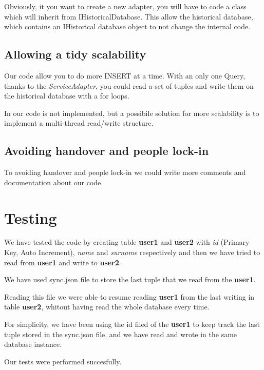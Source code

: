 Obviously, it you want to create a new adapter, you will have to code a class which will inherit from IHistoricalDatabase. This allow the historical database, which contains an IHistorical database object to not change the internal code.

\subsection{Allowing a tidy scalability}

Our code allow you to do more INSERT at a time. With an only one Query, thanks to the \textit{ServiceAdapter}, you could read a set of tuples and write them on the historical database with a for loops.

In our code is not implemented, but a possibile solution for more scalability is to implement a multi-thread read/write structure.

\subsection{Avoiding handover and people lock-in}

To avoiding handover and people lock-in we could write more comments and documentation about our code.

\section{Testing}

We have tested the code by creating table \textbf{user1} and \textbf{user2} with \textit{id} (Primary Key, Auto Increment), \textit{name} and \textit{surname} respectively and then we have tried to read from \textbf{user1} and write to \textbf{user2}.

We have used sync.json file to store the last tuple that we read from the \textbf{user1}.

Reading this file we were able to resume reading \textbf{user1} from the last writing in table \textbf{user2}, whitout having read the whole database every time.

For simplicity, we have been using the id filed of the \textbf{user1} to keep track the last tuple stored in the sync.json file, and we have read and wrote in the same database instance.

Our tests were performed succesfully.


